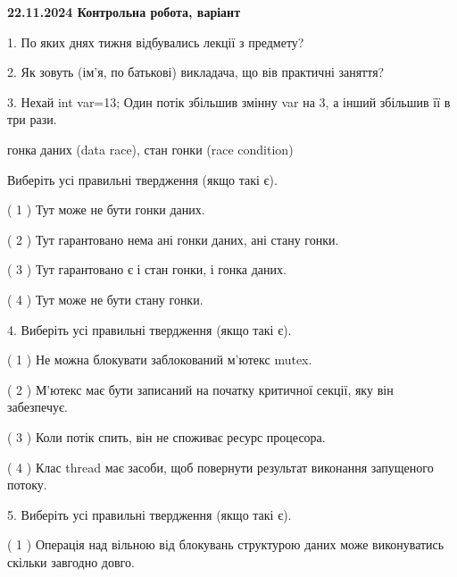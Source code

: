 \documentclass[12pt, ukrainian]{article}
\begin{document}
\vspace{4mm}
\newpage
\begin {large}

\textbf{22.11.2024 Контрольна робота, варіант  }\par


{
1. По яких днях тижня відбувались лекції з предмету?



\vspace{5mm}
2. Як зовуть (ім'я, по батькові) викладача, що вів практичні заняття?



\vspace{5mm}
3. Нехай int var=13; Один потік збільшив змінну var на 3, а інший збільшив її в три рази.

гонка даних (data race), стан гонки (race condition)

Виберіть усі правильні твердження (якщо такі є).\par
\vspace{2mm}
( 1 ) Тут може не бути гонки даних.%

( 2 ) Тут гарантовано нема ані гонки даних, ані стану гонки.%

( 3 ) Тут гарантовано є і стан гонки, і гонка даних.%

( 4 ) Тут може не бути стану гонки.%


\vspace{5mm}
4. Виберіть усі правильні твердження (якщо такі є).\par
\vspace{2mm}

( 1 ) Не можна блокувати заблокований м’ютекс mutex.%

( 2 ) М’ютекс має бути записаний на початку критичної секції, яку він забезпечує.%

( 3 ) Коли потік спить, він не споживає ресурс процесора.%

( 4 ) Клас thread має засоби, щоб повернути результат виконання запущеного потоку.%


\vspace{5mm}
5. Виберіть усі правильні твердження (якщо такі є).\par
\vspace{2mm}

( 1 ) Операція над вільною від блокувань структурою даних може виконуватись скільки завгодно довго.%

}
\end{large}
\end{document}
